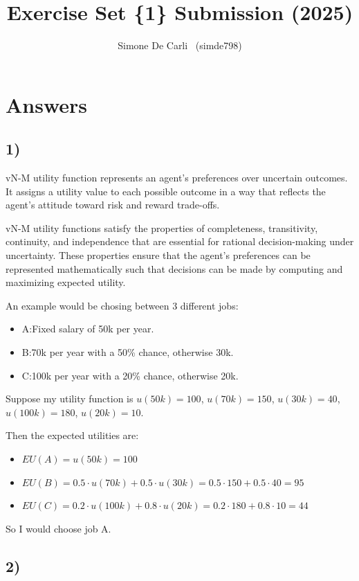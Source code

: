 \documentclass[10pt]{article}
\title{Exercise Set \{1\} Submission (2025)}
\author{Simone De Carli \, (simde798)}
\begin{document}
\maketitle

\section*{Answers}

\subsection*{1)}

vN-M utility function represents an agent's preferences over uncertain outcomes. It assigns a utility value to each possible outcome in a way that reflects the agent's attitude toward risk and reward trade-offs.

vN-M utility functions satisfy the properties of completeness, transitivity, continuity, and independence that are essential for rational decision-making under uncertainty. These properties ensure that the agent's preferences can be represented mathematically such that decisions can be made by computing and maximizing expected utility.

An example would be chosing between 3 different jobs:
\begin{itemize}
\item A:\@ Fixed salary of 50k per year.
\item B:\@ 70k per year with a 50\% chance, otherwise 30k.
\item C:\@ 100k per year with a 20\% chance, otherwise 20k.
\end{itemize}

\noindent
Suppose my utility function is $u(50k) = 100$, $u(70k) = 150$, $u(30k) = 40$, $u(100k) = 180$, $u(20k) = 10$.

\noindent
Then the expected utilities are:

\begin{itemize}
\item $EU(A) = u(50k) = 100$
\item $EU(B) = 0.5\cdot u(70k) + 0.5\cdot u(30k) = 0.5\cdot 150 + 0.5\cdot 40 = 95$
\item $EU(C) = 0.2\cdot u(100k) + 0.8\cdot u(20k) = 0.2\cdot 180 + 0.8\cdot 10 = 44$
\end{itemize}


So I would choose job A.

\subsection*{2)}
\end{document}

